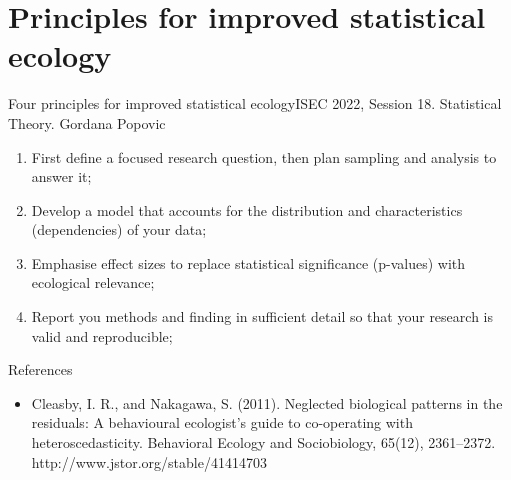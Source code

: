 \documentclass{beamer}
\begin{document}
\section{Principles for improved statistical ecology}

\begin{frame}{Four principles for improved statistical ecology}{ISEC 2022, Session 18. Statistical Theory. Gordana Popovic}

\begin{enumerate}
    \item First define a focused research question, then plan sampling and analysis to answer it; 
    \item Develop a model that accounts for the distribution and characteristics (dependencies) of your data;
    \item Emphasise effect sizes to replace statistical significance (p-values) with ecological relevance;
    \item Report you methods and finding in sufficient detail so that your research is valid and reproducible;
\end{enumerate}
\end{frame}

\begin{frame}{References}

\begin{itemize}
	\item Cleasby, I. R., and Nakagawa, S. (2011). Neglected biological patterns in the residuals: A behavioural ecologist’s guide to co-operating with heteroscedasticity. Behavioral Ecology and Sociobiology, 65(12), 2361–2372. http://www.jstor.org/stable/41414703
\end{itemize}
\end{frame}
\end{document}
